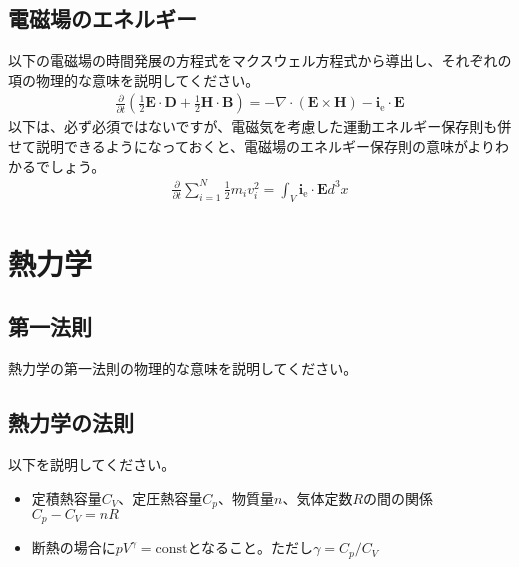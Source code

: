 \documentclass{ltjarticle}
\begin{document}
\subsection{電磁場のエネルギー}
以下の電磁場の時間発展の方程式をマクスウェル方程式から導出し、それぞれの項の物理的な意味を説明してください。
\begin{align}
    \frac{\partial}{\partial t}
    \left(\frac{1}{2}\bm{E}\cdot\bm{D} + \frac{1}{2}\bm{H}\cdot\bm{B}\right) = - \nabla\cdot\left(\bm{E}\times\bm{H}\right) - \bm{i}_\mathrm{e}\cdot\bm{E}
\end{align}
以下は、必ず必須ではないですが、電磁気を考慮した運動エネルギー保存則も併せて説明できるようになっておくと、電磁場のエネルギー保存則の意味がよりわかるでしょう。
\begin{align*}
    \frac{\partial}{\partial t} \sum_{i=1}^N
    \frac{1}{2}m_i v_i^2 = \int_V \bm{i}_\mathrm{e}\cdot\bm{E} d^3x
\end{align*}
\section{熱力学}
\subsection{第一法則}
熱力学の第一法則の物理的な意味を説明してください。
\subsection{熱力学の法則}
以下を説明してください。
\begin{itemize}
    \item 定積熱容量$C_V$、定圧熱容量$C_p$、物質量$n$、気体定数$R$の間の関係$C_p-C_V=nR$
    \item 断熱の場合に$pV^\gamma=\mathrm{const}$となること。ただし$\gamma=C_p/C_V$
\end{itemize}

\appendix
\end{document}
